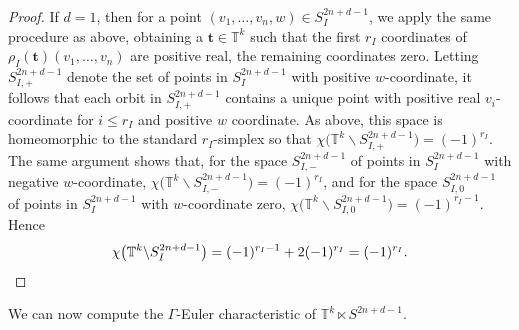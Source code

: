 \documentclass[twoside]{amsart}
\theoremstyle{definition}
\theoremstyle{remark}
\numberwithin{equation}{section}
\newcommand{\T}{\mathbb{T}}
\begin{document}
\begin{proof}
If $d = 1$, then for a point $(v_1,\ldots, v_n, w) \in S_I^{2n + d - 1}$, we apply the same procedure as above, obtaining a
$\mathbf{t}\in\T^k$ such that the first $r_I$ coordinates of $\rho_I(\mathbf{t})(v_1,\ldots,v_n)$ are positive real, the remaining coordinates zero.
Letting $S_{I,+}^{2n + d - 1}$ denote the set of points in $S_I^{2n + d - 1}$ with positive $w$-coordinate, it follows that
each orbit in $S_{I,+}^{2n + d - 1}$ contains a unique point with positive real $v_i$-coordinate for $i \leq r_I$ and positive $w$ coordinate.
As above, this space is homeomorphic to the standard $r_I$-simplex so that
$\chi\big(\T^k\backslash S_{I,+}^{2n + d - 1}\big) = (-1)^{r_I}$. 
The same argument shows that, for the space $S_{I,-}^{2n + d - 1}$ of points in $S_I^{2n + d - 1}$ with negative $w$-coordinate,
$\chi\big(\T^k\backslash S_{I,-}^{2n + d - 1}\big) = (-1)^{r_I}$, and for the space
$S_{I,0}^{2n + d - 1}$ of points in $S_I^{2n + d - 1}$ with $w$-coordinate zero,
$\chi\big(\T^k\backslash S_{I,0}^{2n + d - 1}\big) = (-1)^{r_I - 1}$. Hence
\[
    \chi\big(\T^k\backslash S_I^{2n + d - 1}\big) = (-1)^{r_I - 1} + 2(-1)^{r_I} = (-1)^{r_I}.
    \qedhere
\]
\end{proof}

We can now compute the $\Gamma$-Euler characteristic of $\T^k\ltimes S^{2n + d - 1}$.
\end{document}
